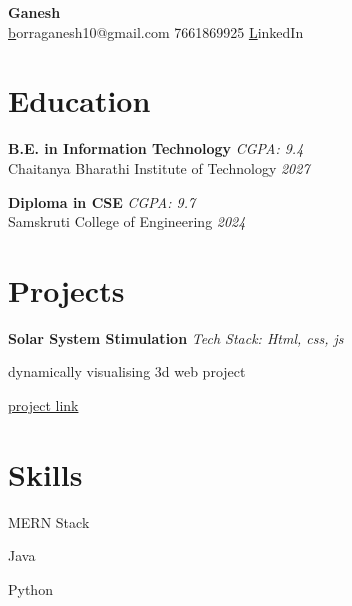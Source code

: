 \documentclass[a4paper,10pt]{article}
\begin{document}
\begin{center}
    {\huge \textbf{ Ganesh }} \\
    \vspace{5pt}
    \small \href{mailto:borraganesh10@gmail.com } borraganesh10@gmail.com \quad \textbullet{} 7661869925     
    \quad \textbullet{} \href{ https://www.linkedin.com/in/ganesh10-/ }LinkedIn 
  
\end{center}

\section*{Education}

\noindent
\textbf{ B.E. in Information Technology } \hfill  \textit{ CGPA: 9.4 } \\
Chaitanya Bharathi Institute of Technology  \hfill  \textit{ 2027 } 
\vspace{0.3cm}

\noindent
\textbf{ Diploma in CSE } \hfill  \textit{ CGPA: 9.7 } \\
Samskruti College of Engineering   \hfill  \textit{ 2024 } 
\vspace{0.3cm}



\section*{Projects}
\noindent
\begin{compactitem}
    
        \item\textbf{ Solar System Stimulation } \hfill \textit{ Tech Stack: Html, css, js } 
        \begin{compactitem}
            
            \item dynamically visualising 3d web project
            
        \end{compactitem}
        \href{  }{project link}
    
\end{compactitem}



\section*{Skills}
\noindent
\begin{compactitem}
    
        \item MERN Stack 
    
        \item Java 
    
        \item Python
    
\end{compactitem}
\end{document}
